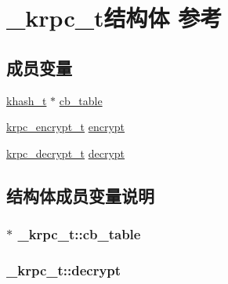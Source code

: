\hypertarget{a00023}{}\section{\+\_\+krpc\+\_\+t结构体 参考}
\label{a00023}
\subsection*{成员变量}
\begin{DoxyCompactItemize}
\item 
\hyperlink{a00053_aa242a9a673d8677076543d5768798f2c_aa242a9a673d8677076543d5768798f2c}{khash\+\_\+t} $\ast$ \hyperlink{a00023_a50621b5d491ad15671a99b3f8de03906_a50621b5d491ad15671a99b3f8de03906}{cb\+\_\+table}
\item 
\hyperlink{a00053_ae41a67cc07f8dff897ca978e03b1f2d7_ae41a67cc07f8dff897ca978e03b1f2d7}{krpc\+\_\+encrypt\+\_\+t} \hyperlink{a00023_a985e4b2ef424723561b3aae37f00ee50_a985e4b2ef424723561b3aae37f00ee50}{encrypt}
\item 
\hyperlink{a00053_a5cf750f151c90f0589f68fe8c4421f1d_a5cf750f151c90f0589f68fe8c4421f1d}{krpc\+\_\+decrypt\+\_\+t} \hyperlink{a00023_a5f5752bc24a785d6bc69b58e1e552080_a5f5752bc24a785d6bc69b58e1e552080}{decrypt}
\end{DoxyCompactItemize}


\subsection{结构体成员变量说明}
\hypertarget{a00023_a50621b5d491ad15671a99b3f8de03906_a50621b5d491ad15671a99b3f8de03906}{}
\subsubsection[{cb\+\_\+table}]{$\ast$ \+\_\+krpc\+\_\+t\+::cb\+\_\+table}\label{a00023_a50621b5d491ad15671a99b3f8de03906_a50621b5d491ad15671a99b3f8de03906}
\hypertarget{a00023_a5f5752bc24a785d6bc69b58e1e552080_a5f5752bc24a785d6bc69b58e1e552080}{}
\subsubsection[{decrypt}]{ \+\_\+krpc\+\_\+t\+::decrypt}\label{a00023_a5f5752bc24a785d6bc69b58e1e552080_a5f5752bc24a785d6bc69b58e1e552080}
\hypertarget{a00023_a985e4b2ef424723561b3aae37f00ee50_a985e4b2ef424723561b3aae37f00ee50}{}
